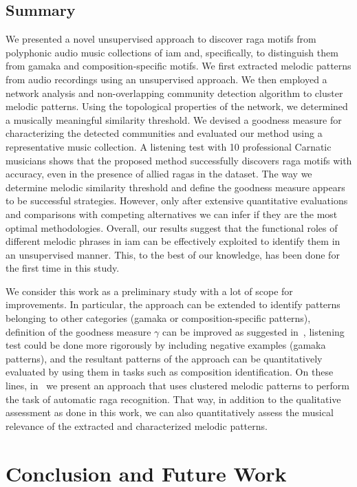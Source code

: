 \subsection{Summary}
\label{sec:patterns_characterization_summary}

We presented a novel unsupervised approach to discover \gls{raga} motifs from polyphonic audio music collections of \gls{iam} and, specifically, to distinguish them from gamaka and composition-specific motifs. We first extracted melodic patterns from audio recordings using an unsupervised approach. We then employed a network analysis and non-overlapping community detection algorithm to cluster melodic patterns. Using the topological properties of the network, we determined a musically meaningful similarity threshold. We devised a goodness measure for characterizing the detected communities and evaluated our method using a representative music collection. A listening test with 10 professional Carnatic musicians shows that the proposed method successfully discovers \gls{raga} motifs with accuracy, even in the presence of allied \glspl{raga} in the dataset. The way we determine melodic similarity threshold and define the goodness measure appears to be successful strategies. However, only after extensive quantitative evaluations and comparisons with competing alternatives we can infer if they are the most optimal methodologies. Overall, our results suggest that the functional roles of different melodic phrases in \gls{iam} can be effectively exploited to identify them in an unsupervised manner. This, to the best of our knowledge, has been done for the first time in this study. 


We consider this work as a preliminary study with a lot of scope for improvements. In particular, the approach can be extended to identify patterns belonging to other categories (\gls{gamaka} or composition-specific patterns), definition of the goodness measure $\gamma$ can be improved as suggested in~, listening test could be done more rigorously by including negative examples (\gls{gamaka} patterns), and the resultant patterns of the approach can be quantitatively evaluated by using them in tasks such as composition identification. On these lines, in~ we present an approach that uses clustered melodic patterns to perform the task of automatic \gls{raga} recognition. That way, in addition to the qualitative assessment as done in this work, we can also quantitatively assess the musical relevance of the extracted and characterized melodic patterns.


\section{Conclusion and Future Work }
